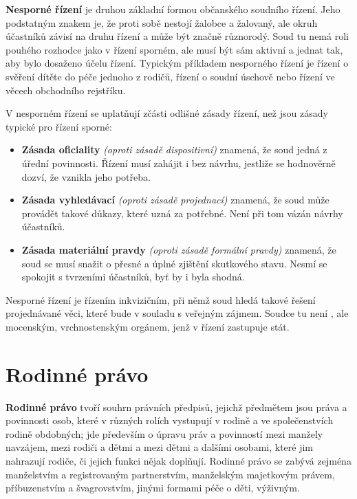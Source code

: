 \textbf{Nesporné řízení} je druhou základní formou občanského soudního řízení. Jeho podstatným znakem je, že proti sobě nestojí žalobce a žalovaný, ale okruh účastníků závisí na druhu řízení a může být značně různorodý. Soud tu nemá roli pouhého rozhodce jako v řízení sporném, ale musí být sám aktivní a jednat tak, aby bylo dosaženo účelu řízení. Typickým příkladem nesporného řízení je řízení o svěření dítěte do péče jednoho z rodičů, řízení o soudní úschově nebo řízení ve věcech obchodního rejstříku.

V nesporném řízení se uplatňují zčásti odlišné zásady řízení, než jsou zásady typické pro řízení sporné:

\begin{itemize}
    \item \textbf{Zásada oficiality} \textit{(oproti zásadě dispositivní)} znamená, že soud jedná z úřední povinnosti. Řízení musí zahájit i bez návrhu, jestliže se hodnověrně dozví, že vznikla jeho potřeba.
    \item \textbf{Zásada vyhledávací} \textit{(oproti zásadě projednací)} znamená, že soud může provádět takové důkazy, které uzná za potřebné. Není při tom vázán návrhy účastníků.
    \item \textbf{Zásada materiální pravdy} \textit{(oproti zásadě formální pravdy)} znamená, že soud se musí snažit o přesné a úplné zjištění skutkového stavu. Nesmí se spokojit s tvrzeními účastníků, byť by i byla shodná.
\end{itemize}

Nesporné řízení je řízením inkvizičním, při němž soud hledá takové řešení projednávané věci, které bude v souladu s veřejným zájmem. Soudce tu není , ale mocenským, vrchnostenským orgánem, jenž v řízení zastupuje stát.

\section{Rodinné právo}

\textbf{Rodinné právo} tvoří souhrn právních předpisů, jejichž předmětem jsou práva a povinnosti osob, které v různých rolích vystupují v rodině a ve společenstvích rodině obdobných; jde především o úpravu práv a povinností mezi manžely navzájem, mezi rodiči a dětmi a mezi dětmi a dalšími osobami, které jim nahrazují rodiče, či jejich funkci nějak doplňují. Rodinné právo se zabývá zejména manželstvím a registrovaným partnerstvím, manželským majetkovým právem, příbuzenstvím a švagrovstvím, jinými formami péče o děti, výživným.

